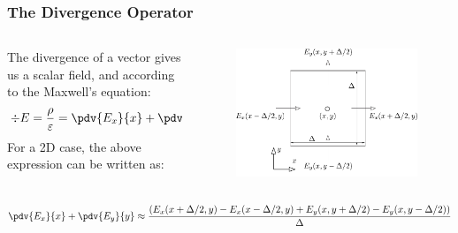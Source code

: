\documentclass[10pt]{beamer}
\newcommand{\E}{\varepsilon}  %
\begin{document}
\begin{frame}
    \frametitle{The Divergence Operator}

    \begin{columns}[T] %
        \begin{column}{.6\textwidth}
            The divergence of a vector gives us a scalar field, and according to the Maxwell's equation:
            \begin{align*}
                \div{E} & = \frac{\rho}{\E} = \pdv{E_x}{x} + \pdv{E_y}{y} +\pdv{E_z}{z}
            \end{align*}
            For a 2D case, the above expression can be written as:
        \end{column}
        \begin{column}{.4\textwidth}
            \begin{figure}[T!]
                \centering
                \includegraphics[width=.95\textwidth]{div_E.pdf}
            \end{figure}
        \end{column}%
    \end{columns}
    \small
    \begin{align*}
        \pdv{E_x}{x} + \pdv{E_y}{y} \approx \frac{\left(E_{x}(x+\Delta/2, y) - E_{x} (x-\Delta/2, y) + E_{y} (x, y+\Delta/2) - E_{y}(x, y-{\Delta}/{2})\right)}{\Delta}
    \end{align*}

\end{frame}
\end{document}
